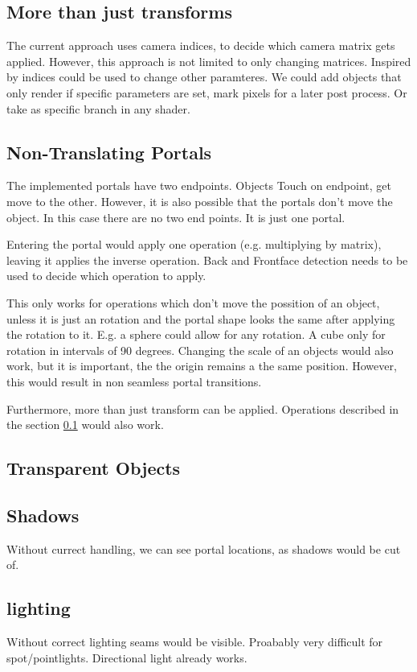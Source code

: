 \subsection{More than just transforms}
\label{more than transforms}
The current approach uses camera indices, to decide which camera matrix gets applied. However, this approach is not limited to only changing matrices. Inspired by \cite{borst:2009:real} indices could be used to change other paramteres. We could add objects that only render if specific parameters are set, mark pixels for a later post process. Or take as specific branch in any shader.

\subsection{Non-Translating Portals}
The implemented portals have two endpoints. Objects Touch on endpoint, get move to the other. However, it is also possible that the portals don't move the object. In this case there are no two end points. It is just one portal.

Entering the portal would apply one operation (e.g. multiplying by matrix), leaving it applies the inverse operation. Back and Frontface detection needs to be used to decide which operation to apply.


This only works for operations which don't move the possition of an object, unless it is just an rotation and the portal shape looks the same after applying the rotation to it. E.g. a sphere could allow for any rotation. A cube only for rotation in intervals of 90 degrees.
Changing the scale of an objects would also work, but it is important, the the origin remains a the same position. However, this would result in non seamless portal transitions.

Furthermore, more than just transform can be applied. Operations described in the section \ref{more than transforms} would also work.

\subsection{Transparent Objects}
\subsection{Shadows}
Without currect handling, we can see portal locations, as shadows would be cut of.
\subsection{lighting}
Without correct lighting seams would be visible. Proabably very difficult for spot/pointlights. Directional light already works.
